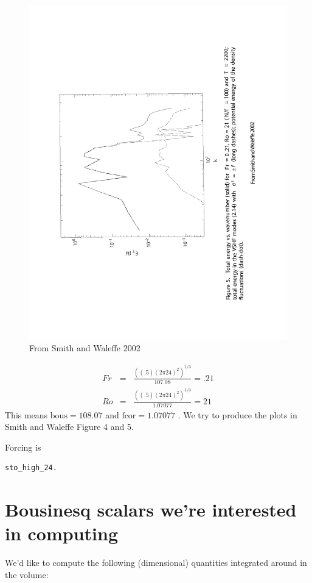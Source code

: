 \documentclass[12pt]{article}
\begin{document}
\begin{figure}
\begin{center}
\includegraphics[angle=-90,width=4.in]{SW02Fig5}
\caption{From Smith and Waleffe 2002}
\label{fig:SW02Fig5}
\end{center}
\end{figure}


\begin{eqnarray}
Fr &=& \frac{\left((.5)(2 \pi 24)^{2}\right)^{1/3}}{107.08}= .21 \\ 
Ro &=& \frac{\left((.5)(2 \pi 24)^{2}\right)^{1/3}}{1.07077} = 21
\end{eqnarray} 
This means $\text{bous}=108.07$ and $\text{fcor} =1.07077 $ . We try
to produce the plots in Smith and Waleffe Figure 4 and 5.

Forcing is
\begin{verbatim}
sto_high_24.
\end{verbatim}


\section{Bousinesq scalars we're interested in computing}

We'd like to compute the following (dimensional) quantities integrated
around in the volume:
\end{document}
